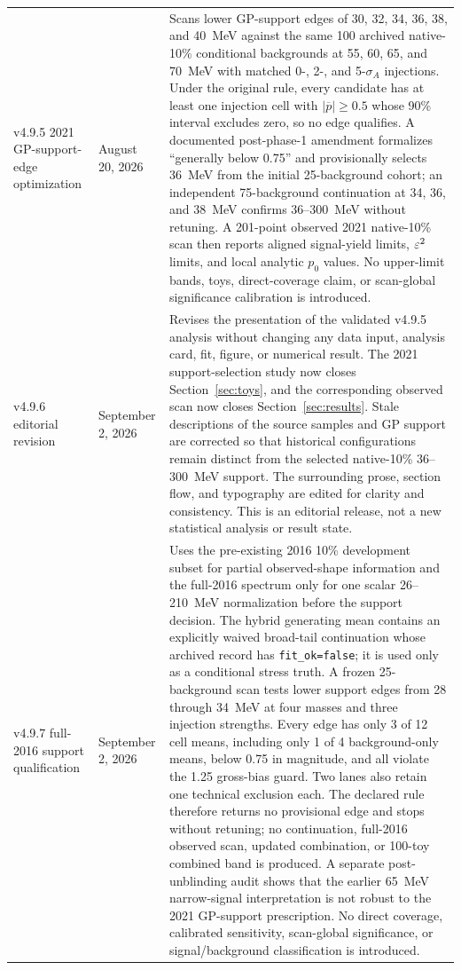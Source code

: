 \begin{longtable}{P{0.11\textwidth}P{0.16\textwidth}P{0.64\textwidth}}
\addlinespace
v4.9.5 2021 GP-support-edge optimization & August 20, 2026 &
Scans lower GP-support edges of 30, 32, 34, 36, 38, and 40~MeV against the same 100
archived native-10\% conditional backgrounds at 55, 60, 65, and 70~MeV with matched
0-, 2-, and 5-$\sigma_A$ injections.  Under the original rule, every candidate has
at least one injection cell with $|\overline p|\geq0.5$ whose 90\% interval excludes
zero, so no edge qualifies.  A documented post-phase-1 amendment
formalizes ``generally below 0.75'' and provisionally selects 36~MeV from the initial
25-background cohort; an independent 75-background continuation at 34, 36, and
38~MeV confirms 36--300~MeV without retuning.  A 201-point observed 2021 native-10\%
scan then reports aligned signal-yield limits, $\varepsilon^2$ limits, and local analytic
$p_0$ values.  No upper-limit bands, \CLs{} toys, direct-coverage claim, or
scan-global significance calibration is introduced. \\
\addlinespace
v4.9.6 editorial revision & September 2, 2026 &
Revises the presentation of the validated v4.9.5 analysis without changing any data
input, analysis card, fit, figure, or numerical result.  The 2021 support-selection
study now closes Section~\ref{sec:toys}, and the corresponding observed scan now
closes Section~\ref{sec:results}.  Stale descriptions of the source samples and GP
support are corrected so that historical configurations remain distinct from the
selected native-10\% 36--300~MeV support.  The surrounding prose, section flow, and
typography are edited for clarity and consistency.  This is an editorial release,
not a new statistical analysis or result state. \\
\addlinespace
v4.9.7 full-2016 support qualification & September 2, 2026 &
Uses the pre-existing 2016 10\% development subset for partial observed-shape
information and the full-2016 spectrum only for one scalar 26--210~MeV normalization
before the support decision.  The hybrid generating mean contains an explicitly
waived broad-tail continuation whose archived record has
\texttt{fit\_ok=false}; it is used only as a conditional stress truth.  A frozen
25-background scan tests lower support edges from 28 through 34~MeV at four masses and
three injection strengths.  Every edge has only 3 of 12 cell means, including only
1 of 4 background-only means, below 0.75 in magnitude, and all violate the 1.25
gross-bias guard.  Two lanes also retain one technical exclusion each.  The declared
rule therefore returns no provisional edge and stops without retuning; no continuation,
full-2016 observed scan, updated combination, or 100-toy combined band is produced.
A separate post-unblinding audit shows that the earlier 65~MeV narrow-signal
interpretation is not robust to the 2021 GP-support prescription.  No direct coverage,
calibrated sensitivity, scan-global significance, or signal/background classification
is introduced. \\
\end{longtable}
\endgroup
